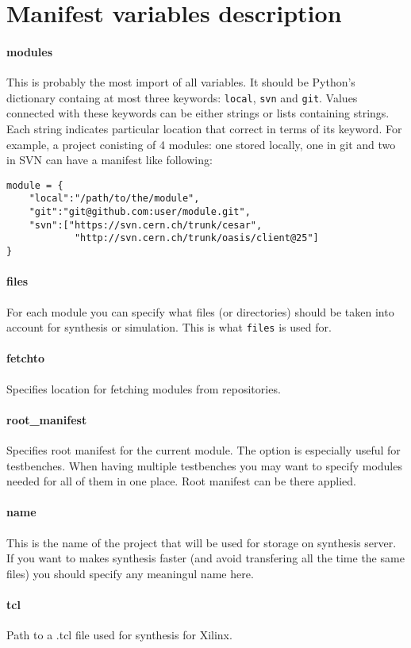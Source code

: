 \documentclass[a4paper,11pt]{article}
\begin{document}
\section{Manifest variables description}\label{subsec:vars}
\paragraph*{modules}
This is probably the most import of all variables. It should be Python's dictionary containg at most three keywords: \verb!local!, \verb!svn! and \verb!git!. Values connected with these keywords can be either strings or lists containing strings. Each string indicates particular location that correct in terms of its keyword. For example, a project conisting of 4 modules: one stored locally, one in git and two in SVN can have a manifest like following:
\begin{lstlisting}
module = {
    "local":"/path/to/the/module",
    "git":"git@github.com:user/module.git",
    "svn":["https://svn.cern.ch/trunk/cesar",
            "http://svn.cern.ch/trunk/oasis/client@25"]
}
\end{lstlisting}
\paragraph*{files}
For each module you can specify what files (or directories) should be taken into account for synthesis or simulation. This is what \verb!files! is used for.
\paragraph*{fetchto}
Specifies location for fetching modules from repositories.
\paragraph*{root\_manifest}
Specifies root manifest for the current module. The option is especially useful for testbenches. When having multiple testbenches you may want to specify modules needed for all of them in one place. Root manifest can be there applied.
\paragraph*{name}
This is the name of the project that will be used for storage on synthesis server. If you want to makes synthesis faster (and avoid transfering all the time the same files) you should specify any meaningul name here.
\paragraph*{tcl}
Path to a .tcl file used for synthesis for Xilinx.
\end{document}
